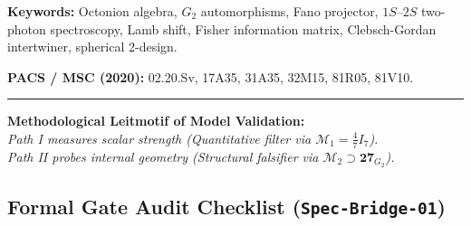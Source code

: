 \documentclass[11pt,a4paper]{article}
\begin{document}
\vspace{0.8em}
\noindent\textbf{Keywords:} Octonion algebra, $G_2$ automorphisms, Fano projector, $1S\text{--}2S$ two-photon spectroscopy, Lamb shift, Fisher information matrix, Clebsch-Gordan intertwiner, spherical 2-design.

\vspace{0.4em}
\noindent\textbf{PACS / MSC (2020):} 02.20.Sv, 17A35, 31A35, 32M15, 81R05, 81V10.

\vspace{1.2em}
\hrule
\vspace{1.5em}

\begin{center}
\colorbox{gray!10}{
    \parbox{0.95\textwidth}{
        \centering\vspace{0.4em}
        \textbf{Methodological Leitmotif of Model Validation:}\\[0.2em]
        \emph{Path I measures scalar strength (Quantitative filter via $\mathcal{M}_1 = \frac{4}{7}I_7$).}\\
        \emph{Path II probes internal geometry (Structural falsifier via $\mathcal{M}_2 \supset \mathbf{27}_{G_2}$).}
        \vspace{0.4em}
    }
}
\end{center}

\vspace{1.5em}

\subsection*{Formal Gate Audit Checklist (\texttt{Spec-Bridge-01})}
\vspace{-0.5em}
\end{document}
